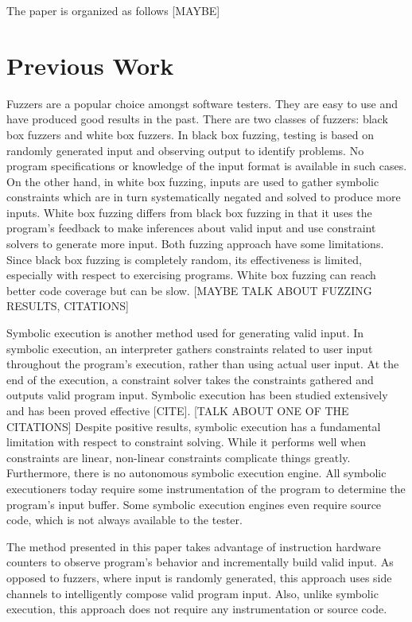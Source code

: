 \documentclass[11pt,twocolumn]{article}
\begin{document}
The paper is organized as follows [MAYBE]

\section{Previous Work}

Fuzzers are a popular choice amongst software testers.
They are easy to use and have produced good results in the past.
There are two classes of fuzzers: black box fuzzers and white box fuzzers.
In black box fuzzing, testing is based on randomly generated input and observing output to identify problems.
No program specifications or knowledge of the input format is available in such cases.
On the other hand, in white box fuzzing, inputs are used to gather symbolic constraints which are in turn systematically negated and solved to produce more inputs.
White box fuzzing differs from black box fuzzing in that it uses the program's feedback to make inferences about valid input and use constraint solvers to generate more input.
Both fuzzing approach have some limitations.
Since black box fuzzing is completely random, its effectiveness is limited, especially with respect to exercising programs.
White box fuzzing can reach better code coverage but can be slow.
[MAYBE TALK ABOUT FUZZING RESULTS, CITATIONS]

Symbolic execution is another method used for generating valid input.
In symbolic execution, an interpreter gathers constraints related to user input throughout the program's execution, rather than using actual user input.
At the end of the execution, a constraint solver takes the constraints gathered and outputs valid program input.
Symbolic execution has been studied extensively and has been proved effective [CITE].
[TALK ABOUT ONE OF THE CITATIONS]
Despite positive results, symbolic execution has a fundamental limitation with respect to constraint solving.
While it performs well when constraints are linear, non-linear constraints complicate things greatly.
Furthermore, there is no autonomous symbolic execution engine.
All symbolic executioners today require some instrumentation of the program to determine the program's input buffer.
Some symbolic execution engines even require source code, which is not always available to the tester.

The method presented in this paper takes advantage of instruction hardware counters to observe program's behavior and incrementally build valid input.
As opposed to fuzzers, where input is randomly generated, this approach uses side channels to intelligently compose valid program input.
Also, unlike symbolic execution, this approach does not require any instrumentation or source code.
\end{document}
